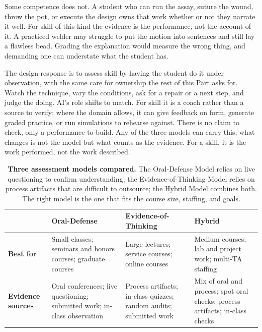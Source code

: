 \documentclass{SIAMbook2023}
\begin{document}
Some competence does not. A student who can run the assay, suture the wound, throw the pot, or execute the design owns that work whether or not they narrate it well. For skill of this kind the evidence is the performance, not the account of it. A practiced welder may struggle to put the motion into sentences and still lay a flawless bead. Grading the explanation would measure the wrong thing, and demanding one can understate what the student has.

The design response is to assess skill by having the student do it under observation, with the same care for ownership the rest of this Part asks for. Watch the technique, vary the conditions, ask for a repair or a next step, and judge the doing. AI's role shifts to match. For skill it is a coach rather than a source to verify: where the domain allows, it can give feedback on form, generate graded practice, or run simulations to rehearse against. There is no claim to check, only a performance to build. Any of the three models can carry this; what changes is not the model but what counts as the evidence. For a skill, it is the work performed, not the work described.

\begin{table}[ht]
\centering
\caption{\textbf{Three assessment models compared.} The Oral-Defense Model relies on live questioning to confirm understanding; the Evidence-of-Thinking Model relies on process artifacts that are difficult to outsource; the Hybrid Model combines both. The right model is the one that fits the course size, staffing, and goals.}
\label{tab:three-models}
\small
\begin{tabularx}{\textwidth}{>{\raggedright\arraybackslash}p{2.0cm} >{\raggedright\arraybackslash}X >{\raggedright\arraybackslash}X >{\raggedright\arraybackslash}X}
\toprule
 & \textbf{Oral-Defense} & \textbf{Evidence-of-Thinking} & \textbf{Hybrid} \\
\midrule
\textbf{Best for} & Small classes; seminars and honors courses; graduate courses & Large lectures; service courses; online courses & Medium courses; lab and project work; multi-TA staffing \\
\addlinespace
\textbf{Evidence sources} & Oral conferences; live questioning; submitted work; in-class observation & Process artifacts; in-class quizzes; random audits; submitted work & Mix of oral and process; spot oral checks; process artifacts; in-class checks \\
\bottomrule
\end{tabularx}
\end{table}
\end{document}
